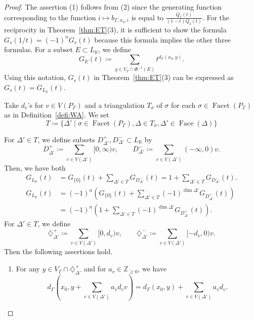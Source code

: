 \documentclass[ALCO,published]{cedram}
\theoremstyle{remark}
\begin{document}
\begin{proof}
The assertion (1) follows from (2) since the generating function corresponding to the function $i \mapsto b_{\Gamma, x_0, i}$ is equal to $\frac{Q_1(t)}{(1-t)Q_2(t)}$. 
For the reciprocity in Theorem~\ref{thm:ET}(3), it is sufficient to show the formula 
$G_s(1/t) = (-1)^n G_s(t)$ because this formula implies the other three formulas. 
For a subset $E \subset L_{\mathbb{R}}$, we define 
\[
G_E(t) \coloneqq  \sum _{y \in V_{\Gamma} \cap \Phi ^{-1}(E)} t^{d_{\Gamma}(x_0, y)}.  
\]
Using this notation, $G_s(t)$ in Theorem~\ref{thm:ET}(3) can be expressed as 
$G_s(t) = G_{L_{\mathbb{R}}} (t)$. 

Take $d_v$'s for $v \in V(P_{\Gamma})$ and a triangulation $T_{\sigma}$ of $\sigma$ for each 
$\sigma \in \operatorname{Facet}(P_{\Gamma})$ as in Definition~\ref{defi:WA}. 
We set 
\[
T \coloneqq  \{ \Delta' \mid \sigma \in \operatorname{Facet}(P_{\Gamma}), 
\Delta \in T_{\sigma}, \Delta ' \in \operatorname{Face}(\Delta) \}
\]

For $\Delta ' \in T$, 
we define subsets $D^+ _{\Delta '}, D^- _{\Delta '}\subset L_{\mathbb{R}}$ by
\[
D^+ _{\Delta '} \coloneqq  \sum _{v \in V(\Delta ')} [0, \infty) v, \qquad 
D^- _{\Delta '} \coloneqq  \sum _{v \in V(\Delta ')} (- \infty, 0) v. 
\]
Then, we have both
\begin{align*}
G_{L_{\mathbb{R}}}(t) \tag{$\spadesuit$}
&= G_{\{ 0 \}}(t) + \sum_{\Delta ' \in T} G_{D^{-}_{\Delta '}}(t) 
= 1 + \sum_{\Delta ' \in T} G_{D^{-}_{\Delta '}}(t). \\ 
G_{L_{\mathbb{R}}}(t) 
&= (-1)^n \left( G_{\{ 0 \}}(t) 
+ \sum_{\Delta ' \in T} (-1)^{\dim \Delta '} G_{D^{+}_{\Delta '}}(t) \right)\\
&= (-1)^n \left( 1 + \sum_{\Delta ' \in T} (-1)^{\dim \Delta '} G_{D^{+}_{\Delta '}}(t) \right). 
\end{align*}
For $\Delta ' \in T$, we define 
\[
\diamondsuit^+ _{\Delta '} \coloneqq  \sum _{v \in V(\Delta ')} [0, d_v) v, \qquad 
\diamondsuit^- _{\Delta '} \coloneqq  \sum _{v \in V(\Delta ')} [-d_v, 0) v. 
\]
Then the following assertions hold. 
\begin{claim}\label{claim:diamond}
\begin{enumerate}
\item 
For any $y \in V_{\Gamma} \cap \diamondsuit^+ _{\Delta '}$
and for $a_v \in \mathbb{Z}_{\ge 0}$, 
we have 
\[
d_{\Gamma} \left( x_0, y + \sum _{v \in V(\Delta ')} a_v d_v v \right) 
= d_{\Gamma} (x_0, y) + \sum _{v \in V(\Delta ')} a_v d_v. 
\]


\end{enumerate}
\end{claim}
\end{proof}
\end{document}
